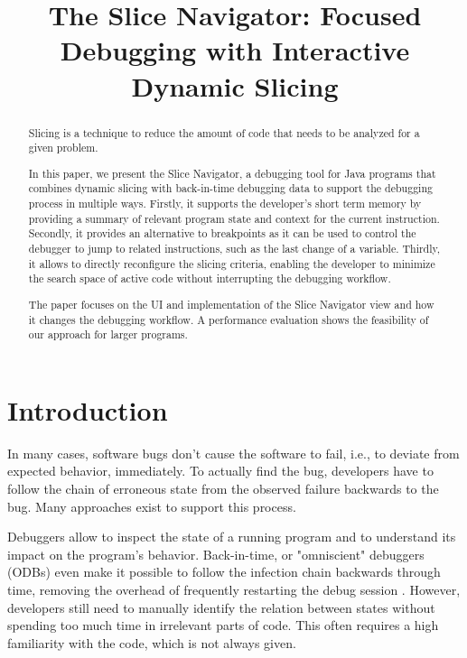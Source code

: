 ﻿\documentclass[
      english,
			conference,
      ]{IEEEtran}
\title{The Slice Navigator: Focused Debugging with Interactive Dynamic Slicing}
\author{\IEEEauthorblockN{Arian Treffer}
\IEEEauthorblockA{Hasso-Plattner-Institut\\
Potsdam, Germany\\
Email: arian.treffer@hpi.de}
\and
\IEEEauthorblockN{Matthias Uflacker}
\IEEEauthorblockA{Hasso-Plattner-Institut\\
Potsdam, Germany\\
Email: matthias.uflacker@hpi.de}
}
\begin{document}
\maketitle

\begin{abstract}
Slicing is a technique to reduce the amount of code that needs to be analyzed for a given problem.

In this paper, we present the Slice Navigator, a debugging tool for Java programs that combines dynamic slicing with back-in-time debugging data to support the debugging process in multiple ways.
Firstly, it supports the developer's short term memory by providing a summary of relevant program state and context for the current instruction.
Secondly, it provides an alternative to breakpoints as it can be used to control the debugger to jump to related instructions, such as the last change of a variable.
Thirdly, it allows to directly reconfigure the slicing criteria, enabling the developer to minimize the search space of active code without interrupting the debugging workflow.

The paper focuses on the UI and implementation of the Slice Navigator view and how it changes the debugging workflow.
A performance evaluation shows the feasibility of our approach for larger programs.

\end{abstract}

\section{Introduction}
\label{sec:introduction}

In many cases, software bugs don't cause the software to fail, i.e., to deviate from expected behavior, immediately.
To actually find the bug, developers have to follow the chain of erroneous state from the observed failure backwards to the bug.
Many approaches exist to support this process.

Debuggers allow to inspect the state of a running program and to understand its impact on the program's behavior.
Back-in-time, or "omniscient" debuggers (ODBs) even make it possible to follow the infection chain backwards through time, removing the overhead of frequently restarting the debug session \cite{lewis_debugging_2003}.
However, developers still need to manually identify the relation between states without spending too much time in irrelevant parts of code.
This often requires a high familiarity with the code, which is not always given.
%
\end{document}

